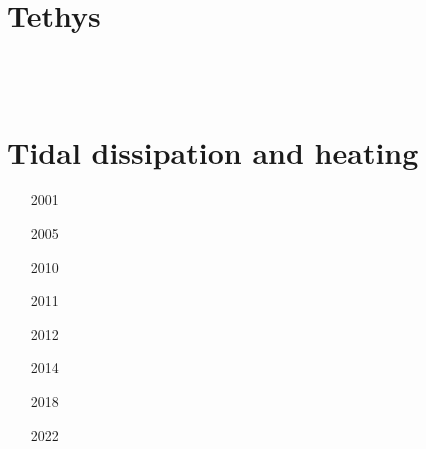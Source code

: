 \section{Tethys} 

\begin{small}
\begin{itemize}
\item[\nineteenninetynine] 
\item[\twothousand] 
\item[\twothousandeleven] 
\item[\twothousandthirteen]
\item[\twothousandsixteen] 
\item[\twothousandeighteen] 
\item[\twothousandtwentytwo] 
 \\
 \\
\item[\twothousandtwentythree]
\end{itemize}
\end{small}

\section{Tidal dissipation and heating} 

\begin{small}
\begin{itemize}
\item[2001]
\item[2005]
\item[2010]
\item[2011]
\item[2012]
\item[2014] 
\item[2018] 
\item[2022]
\end{itemize}
\end{small}

